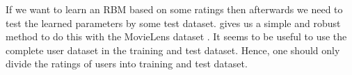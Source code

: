 \documentclass[crop=false,10pt]{standalone}
\begin{document}
    If we want to learn an RBM based on some ratings then afterwards we need to test the learned parameters by some test dataset.
    \cite{towardsdatascience} gives us a simple and robust method to do this with the MovieLens dataset \cite{MovieLensDataset}.
    It seems to be useful to use the complete user dataset in the training and test dataset.
    Hence, one should only divide the ratings of users into training and test dataset.
    \cite{towardsdatascience}

\end{document}
